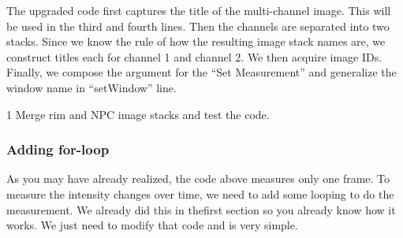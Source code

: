 The upgraded code first captures the title of the multi-channel image. This will be used in the third and fourth lines. Then the channels are separated into two stacks. Since we know the rule of how the resulting image stack names are, we construct titles each for channel 1 and channel 2. We then acquire image IDs. Finally,  we compose the argument for the ``Set Measurement'' and generalize the window name in ``setWindow'' line.

\begin{indentexercise}
{1}
Merge rim and NPC image stacks and test the code. 

\end{indentexercise}

\subsubsection{Adding for-loop}

As you may have already realized, the code above measures only one frame. To measure the intensity changes over time, we need to add some looping to do the measurement. We already did this in thefirst section so you already know how it works. We just need to modify that code and is very simple.